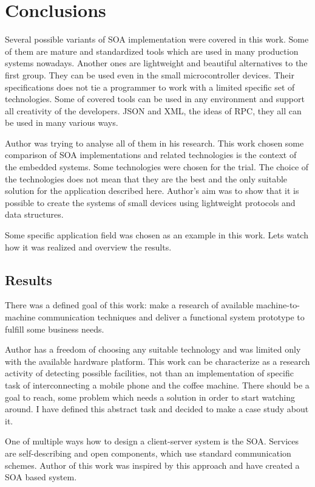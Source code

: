 \newpage
\section{Conclusions}

Several possible variants of \gls{SOA} implementation were covered in this work.
Some of them are mature and standardized tools which are used in many production
systems nowadays.
Another ones are lightweight and beautiful alternatives to the first group. They
can be  used even in the small microcontroller devices. 
Their specifications does not tie a programmer to work with a limited specific
set of technologies. 
Some of covered tools can be used in any environment and support all creativity
of the developers. 
JSON and XML, the ideas of RPC, they all can be used in many various ways.

Author was trying to analyse all of them in his research.
This work chosen some comparison of SOA implementations and related technologies
is the context of the embedded systems.
Some technologies were chosen for the trial.
The choice of the technologies  does not mean that they are the best and the
only suitable solution for the application described here.
Author's  aim was to show that it is possible to create the systems of small
devices using lightweight protocols and data structures.

Some specific application field was chosen as an example in this work.
Lets watch how it was realized and overview the results.

\subsection{Results}

There was a defined goal of this work: make a research of available
machine-to-machine communication techniques and deliver a functional system
prototype to fulfill some business needs.

Author has a freedom of choosing any suitable technology and was limited only
with the available hardware platform. 
This work can be characterize as a research activity of detecting possible
facilities, not than an implementation of specific task of interconnecting
a mobile phone and the coffee machine.
There should be a goal to reach, some problem which needs a solution in order to
start watching around. 
I have defined this abstract task and decided to make a
case study about it.

One of multiple ways how to design a client-server system is the
\gls{SOA}. Services are self-describing and open components, which use standard
communication schemes. 
Author of this work was inspired by this approach and have created a SOA
based system.


